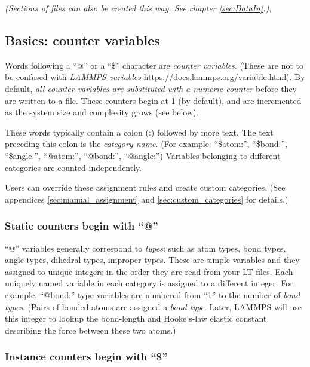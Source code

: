 \documentclass[11pt]{article}
\begin{document}
\textit{(Sections of files can also be created this way.
See chapter \ref{sec:DataIn}.)},


\subsection{Basics: counter variables}
\label{sec:variables}

Words following a ``@'' or a ``\$'' character
are \textit{counter variables}. 
(These are not to be confused with \textit{LAMMPS variables}
 \url{https://docs.lammps.org/variable.html}).
By default, 
\textit{all counter variables are substituted with a numeric counter}
before they are written to a file. 
These counters begin at 1 (by default), and 
are incremented as the system size and complexity grows (see below).

These words typically contain a colon (:) followed by more text.
The text preceding this colon is the \textit{category name}. 
(For example: ``\$atom:'', ``\$bond:'', ``\$angle:'', 
     ``@atom:'', ``@bond:'', ``@angle:'') 
Variables belonging to different categories 
are counted independently. 

Users can override these assignment rules and create custom categories.
(See appendices \ref{sec:manual_assignment} and \ref{sec:custom_categories}
for details.)

\subsubsection{Static counters begin with ``@''}
\label{sec:static_variables}

``@'' variables generally correspond to \textit{types}: 
such as atom types, bond types, angle types, dihedral types, improper types.
These are simple variables and they assigned to unique integers in the 
order they are read from your LT files.
Each uniquely named variable in each category is assigned to a different 
integer.  For example, ``@bond:'' type variables are numbered from ``1''
to the number of \textit{bond types}.
(Pairs of bonded atoms are assigned a \textit{bond type}. 
Later, LAMMPS will use this integer to lookup the bond-length and Hooke's-law 
elastic constant describing the force between these two atoms.)


\subsubsection{Instance counters begin with ``\$''}
\label{sec:instance_variables}
\end{document}
